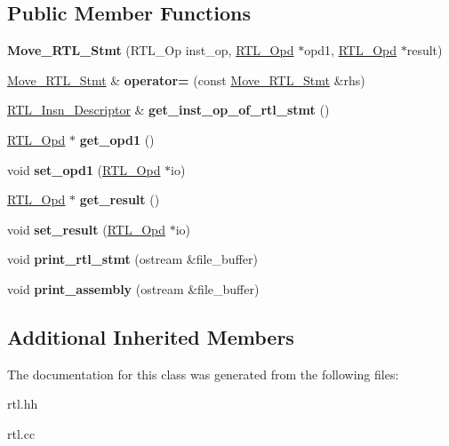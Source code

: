 \subsection*{Public Member Functions}
\begin{DoxyCompactItemize}
\item 
\mbox{\label{classMove__RTL__Stmt_a2563e5ad7f40a37a3287840a3bb0ee9e}} 
{\bfseries Move\+\_\+\+R\+T\+L\+\_\+\+Stmt} (R\+T\+L\+\_\+\+Op inst\+\_\+op, \hyperlink{classRTL__Opd}{R\+T\+L\+\_\+\+Opd} $\ast$opd1, \hyperlink{classRTL__Opd}{R\+T\+L\+\_\+\+Opd} $\ast$result)
\item 
\mbox{\label{classMove__RTL__Stmt_ac6b724a936c2d1dee909dc7e6633a368}} 
\hyperlink{classMove__RTL__Stmt}{Move\+\_\+\+R\+T\+L\+\_\+\+Stmt} \& {\bfseries operator=} (const \hyperlink{classMove__RTL__Stmt}{Move\+\_\+\+R\+T\+L\+\_\+\+Stmt} \&rhs)
\item 
\mbox{\label{classMove__RTL__Stmt_a7e3d8a1a2e401d29f9500d75f97a32a4}} 
\hyperlink{classRTL__Insn__Descriptor}{R\+T\+L\+\_\+\+Insn\+\_\+\+Descriptor} \& {\bfseries get\+\_\+inst\+\_\+op\+\_\+of\+\_\+rtl\+\_\+stmt} ()
\item 
\mbox{\label{classMove__RTL__Stmt_a5e1392d7c9756274a3b3a978c807d66c}} 
\hyperlink{classRTL__Opd}{R\+T\+L\+\_\+\+Opd} $\ast$ {\bfseries get\+\_\+opd1} ()
\item 
\mbox{\label{classMove__RTL__Stmt_ab125481e8172caa3c91bfab5966cc2c8}} 
void {\bfseries set\+\_\+opd1} (\hyperlink{classRTL__Opd}{R\+T\+L\+\_\+\+Opd} $\ast$io)
\item 
\mbox{\label{classMove__RTL__Stmt_ac30662deb6e903c282985fd1145574d2}} 
\hyperlink{classRTL__Opd}{R\+T\+L\+\_\+\+Opd} $\ast$ {\bfseries get\+\_\+result} ()
\item 
\mbox{\label{classMove__RTL__Stmt_a6bac27eb25c7704bb0f330b378df87fd}} 
void {\bfseries set\+\_\+result} (\hyperlink{classRTL__Opd}{R\+T\+L\+\_\+\+Opd} $\ast$io)
\item 
\mbox{\label{classMove__RTL__Stmt_a62a25f356a2ee0a9c1121f7d53992a0d}} 
void {\bfseries print\+\_\+rtl\+\_\+stmt} (ostream \&file\+\_\+buffer)
\item 
\mbox{\label{classMove__RTL__Stmt_af2af8e9e0693c63de001f2682b07813c}} 
void {\bfseries print\+\_\+assembly} (ostream \&file\+\_\+buffer)
\end{DoxyCompactItemize}
\subsection*{Additional Inherited Members}


The documentation for this class was generated from the following files\+:\begin{DoxyCompactItemize}
\item 
rtl.\+hh\item 
rtl.\+cc\end{DoxyCompactItemize}
